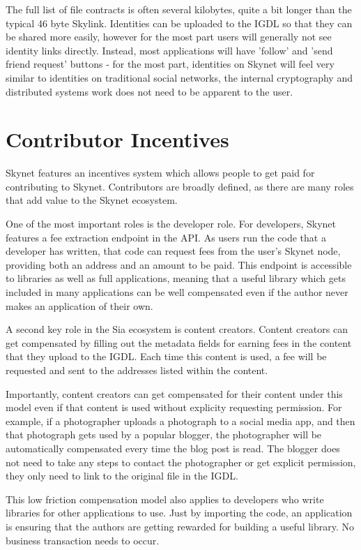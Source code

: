 \documentclass[twocolumn]{article}
\begin{document}
The full list of file contracts is often several kilobytes, quite a bit longer
than the typical 46 byte Skylink. Identities can be uploaded to the IGDL so that
they can be shared more easily, however for the most part users will generally
not see identity links directly. Instead, most applications will have 'follow'
and 'send friend request' buttons - for the most part, identities on Skynet will
feel very similar to identities on traditional social networks, the internal
cryptography and distributed systems work does not need to be apparent to the
user.

\section{Contributor Incentives}
Skynet features an incentives system which allows people to get paid for
contributing to Skynet. Contributors are broadly defined, as there are many
roles that add value to the Skynet ecosystem.

One of the most important roles is the developer role. For developers, Skynet
features a fee extraction endpoint in the API. As users run the code that a
developer has written, that code can request fees from the user's Skynet node,
providing both an address and an amount to be paid. This endpoint is accessible
to libraries as well as full applications, meaning that a useful library which
gets included in many applications can be well compensated even if the author
never makes an application of their own.

A second key role in the Sia ecosystem is content creators. Content creators can
get compensated by filling out the metadata fields for earning fees in the
content that they upload to the IGDL. Each time this content is used, a fee will
be requested and sent to the addresses listed within the content.

Importantly, content creators can get compensated for their content under this
model even if that content is used without explicity requesting permission. For
example, if a photographer uploads a photograph to a social media app, and then
that photograph gets used by a popular blogger, the photographer will be
automatically compensated every time the blog post is read. The blogger does not
need to take any steps to contact the photographer or get explicit permission,
they only need to link to the original file in the IGDL.

This low friction compensation model also applies to developers who write
libraries for other applications to use. Just by importing the code, an
application is ensuring that the authors are getting rewarded for building a
useful library. No business transaction needs to occur.
\end{document}
